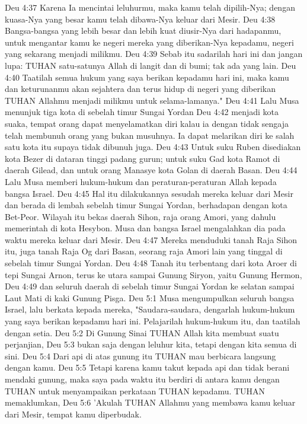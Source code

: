 Deu 4:37  Karena Ia mencintai leluhurmu, maka kamu telah dipilih-Nya; dengan kuasa-Nya yang besar kamu telah dibawa-Nya keluar dari Mesir.
Deu 4:38  Bangsa-bangsa yang lebih besar dan lebih kuat diusir-Nya dari hadapanmu, untuk mengantar kamu ke negeri mereka yang diberikan-Nya kepadamu, negeri yang sekarang menjadi milikmu.
Deu 4:39  Sebab itu sadarilah hari ini dan jangan lupa: TUHAN satu-satunya Allah di langit dan di bumi; tak ada yang lain.
Deu 4:40  Taatilah semua hukum yang saya berikan kepadamu hari ini, maka kamu dan keturunanmu akan sejahtera dan terus hidup di negeri yang diberikan TUHAN Allahmu menjadi milikmu untuk selama-lamanya."
Deu 4:41  Lalu Musa menunjuk tiga kota di sebelah timur Sungai Yordan
Deu 4:42  menjadi kota suaka, tempat orang dapat menyelamatkan diri kalau ia dengan tidak sengaja telah membunuh orang yang bukan musuhnya. Ia dapat melarikan diri ke salah satu kota itu supaya tidak dibunuh juga.
Deu 4:43  Untuk suku Ruben disediakan kota Bezer di dataran tinggi padang gurun; untuk suku Gad kota Ramot di daerah Gilead, dan untuk orang Manasye kota Golan di daerah Basan.
Deu 4:44  Lalu Musa memberi hukum-hukum dan peraturan-peraturan Allah kepada bangsa Israel.
Deu 4:45  Hal itu dilakukannya sesudah mereka keluar dari Mesir dan berada di lembah sebelah timur Sungai Yordan, berhadapan dengan kota Bet-Peor. Wilayah itu bekas daerah Sihon, raja orang Amori, yang dahulu memerintah di kota Hesybon. Musa dan bangsa Israel mengalahkan dia pada waktu mereka keluar dari Mesir.
Deu 4:47  Mereka menduduki tanah Raja Sihon itu, juga tanah Raja Og dari Basan, seorang raja Amori lain yang tinggal di sebelah timur Sungai Yordan.
Deu 4:48  Tanah itu terbentang dari kota Aroer di tepi Sungai Arnon, terus ke utara sampai Gunung Siryon, yaitu Gunung Hermon,
Deu 4:49  dan seluruh daerah di sebelah timur Sungai Yordan ke selatan sampai Laut Mati di kaki Gunung Pisga.
Deu 5:1  Musa mengumpulkan seluruh bangsa Israel, lalu berkata kepada mereka, "Saudara-saudara, dengarlah hukum-hukum yang saya berikan kepadamu hari ini. Pelajarilah hukum-hukum itu, dan taatilah dengan setia.
Deu 5:2  Di Gunung Sinai TUHAN Allah kita membuat suatu perjanjian,
Deu 5:3  bukan saja dengan leluhur kita, tetapi dengan kita semua di sini.
Deu 5:4  Dari api di atas gunung itu TUHAN mau berbicara langsung dengan kamu.
Deu 5:5  Tetapi karena kamu takut kepada api dan tidak berani mendaki gunung, maka saya pada waktu itu berdiri di antara kamu dengan TUHAN untuk menyampaikan perkataan TUHAN kepadamu. TUHAN memaklumkan,
Deu 5:6  'Akulah TUHAN Allahmu yang membawa kamu keluar dari Mesir, tempat kamu diperbudak.
